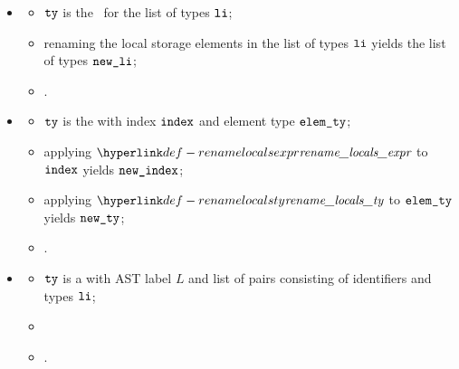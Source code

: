 \begin{itemize}
  \item {}
  \begin{itemize}
    \item $\texttt{ty}$ is the \tupletypeterm\ for the list of types $\texttt{li}$;
    \item renaming the local storage elements in the list of types $\texttt{li}$ yields the list of types $\texttt{new\_li}$;
    \item {}.
  \end{itemize}

  \item {}
  \begin{itemize}
    \item $\texttt{ty}$ is the \arraytypeterm{} with index $\texttt{index}$ and element type $\texttt{elem\_ty}$;
    \item applying $\renamelocalsexpr$ to $\texttt{index}$ yields $\texttt{new\_index}$;
    \item applying $\renamelocalsty$ to $\texttt{elem\_ty}$ yields $\texttt{new\_ty}$;
    \item {}.
  \end{itemize}

  \item {}
  \begin{itemize}
    \item $\texttt{ty}$ is a \structuredtypeterm{} with AST label $L$ and list of pairs consisting of identifiers and types $\texttt{li}$;
    \item {}
    \item {}.
  \end{itemize}
\end{itemize}

\FormallyParagraph
\begin{mathpar}
\end{mathpar}

